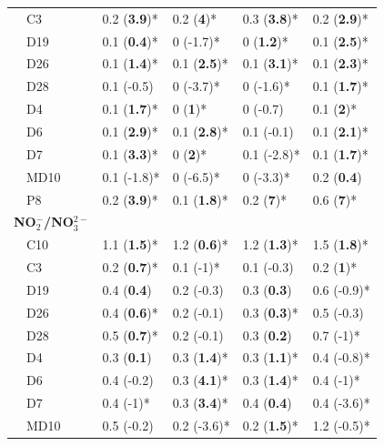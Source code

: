 \documentclass[letterpaper,12pt,oneside]{article}\usepackage[]{graphicx}\usepackage[]{color}
\begin{document}
\begin{table}[!tbp]
\begin{center}
\begin{tabular}{lllll}
~~C3&0.2 \footnotesize{(\textbf{3.9})*}&0.2 \footnotesize{(\textbf{4})*}&0.3 \footnotesize{(\textbf{3.8})*}&0.2 \footnotesize{(\textbf{2.9})*}\tabularnewline
~~D19&0.1 \footnotesize{(\textbf{0.4})*}&0 \footnotesize{(-1.7)*}&0 \footnotesize{(\textbf{1.2})*}&0.1 \footnotesize{(\textbf{2.5})*}\tabularnewline
~~D26&0.1 \footnotesize{(\textbf{1.4})*}&0.1 \footnotesize{(\textbf{2.5})*}&0.1 \footnotesize{(\textbf{3.1})*}&0.1 \footnotesize{(\textbf{2.3})*}\tabularnewline
~~D28&0.1 \footnotesize{(-0.5)}&0 \footnotesize{(-3.7)*}&0 \footnotesize{(-1.6)*}&0.1 \footnotesize{(\textbf{1.7})*}\tabularnewline
~~D4&0.1 \footnotesize{(\textbf{1.7})*}&0 \footnotesize{(\textbf{1})*}&0 \footnotesize{(-0.7)}&0.1 \footnotesize{(\textbf{2})*}\tabularnewline
~~D6&0.1 \footnotesize{(\textbf{2.9})*}&0.1 \footnotesize{(\textbf{2.8})*}&0.1 \footnotesize{(-0.1)}&0.1 \footnotesize{(\textbf{2.1})*}\tabularnewline
~~D7&0.1 \footnotesize{(\textbf{3.3})*}&0 \footnotesize{(\textbf{2})*}&0.1 \footnotesize{(-2.8)*}&0.1 \footnotesize{(\textbf{1.7})*}\tabularnewline
~~MD10&0.1 \footnotesize{(-1.8)*}&0 \footnotesize{(-6.5)*}&0 \footnotesize{(-3.3)*}&0.2 \footnotesize{(\textbf{0.4})}\tabularnewline
~~P8&0.2 \footnotesize{(\textbf{3.9})*}&0.1 \footnotesize{(\textbf{1.8})*}&0.2 \footnotesize{(\textbf{7})*}&0.6 \footnotesize{(\textbf{7})*}\tabularnewline
\hline
{\bfseries NO$_{2}^{-}$/NO$_{3}^{2-}$}&&&&\tabularnewline
~~C10&1.1 \footnotesize{(\textbf{1.5})*}&1.2 \footnotesize{(\textbf{0.6})*}&1.2 \footnotesize{(\textbf{1.3})*}&1.5 \footnotesize{(\textbf{1.8})*}\tabularnewline
~~C3&0.2 \footnotesize{(\textbf{0.7})*}&0.1 \footnotesize{(-1)*}&0.1 \footnotesize{(-0.3)}&0.2 \footnotesize{(\textbf{1})*}\tabularnewline
~~D19&0.4 \footnotesize{(\textbf{0.4})}&0.2 \footnotesize{(-0.3)}&0.3 \footnotesize{(\textbf{0.3})}&0.6 \footnotesize{(-0.9)*}\tabularnewline
~~D26&0.4 \footnotesize{(\textbf{0.6})*}&0.2 \footnotesize{(-0.1)}&0.3 \footnotesize{(\textbf{0.3})*}&0.5 \footnotesize{(-0.3)}\tabularnewline
~~D28&0.5 \footnotesize{(\textbf{0.7})*}&0.2 \footnotesize{(-0.1)}&0.3 \footnotesize{(\textbf{0.2})}&0.7 \footnotesize{(-1)*}\tabularnewline
~~D4&0.3 \footnotesize{(\textbf{0.1})}&0.3 \footnotesize{(\textbf{1.4})*}&0.3 \footnotesize{(\textbf{1.1})*}&0.4 \footnotesize{(-0.8)*}\tabularnewline
~~D6&0.4 \footnotesize{(-0.2)}&0.3 \footnotesize{(\textbf{4.1})*}&0.3 \footnotesize{(\textbf{1.4})*}&0.4 \footnotesize{(-1)*}\tabularnewline
~~D7&0.4 \footnotesize{(-1)*}&0.3 \footnotesize{(\textbf{3.4})*}&0.4 \footnotesize{(\textbf{0.4})}&0.4 \footnotesize{(-3.6)*}\tabularnewline
~~MD10&0.5 \footnotesize{(-0.2)}&0.2 \footnotesize{(-3.6)*}&0.2 \footnotesize{(\textbf{1.5})*}&1.2 \footnotesize{(-0.5)*}\tabularnewline

\end{tabular}
\end{center}
\end{table}
\end{document}
